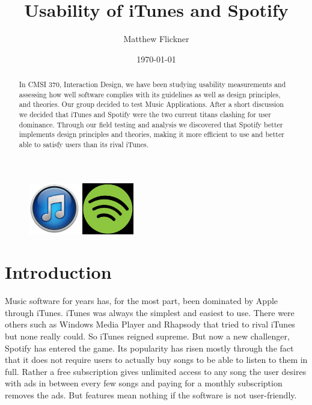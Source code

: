 \documentclass[a4paper]{article}
\title{Usability of iTunes and Spotify}
\author{Matthew Flickner}
\date{\today}
\begin{document}
\maketitle

\begin{abstract}
In CMSI 370, Interaction Design, we have been studying usability measurements and assessing how well software complies with its guidelines as well as design principles, and theories. Our group decided to test Music Applications. After a short discussion we decided that iTunes and Spotify were the two current titans clashing for user dominance. Through our field testing and analysis we discovered that Spotify better implements design principles and theories, making it more efficient to use and better able to satisfy users than its rival iTunes.
\end{abstract}

\begin{figure}[H]
\centering
\includegraphics[width=0.2\textwidth]{ITunes_11_Logo.png}
\includegraphics[width=0.2\textwidth]{spotifylogo.jpg}
\end{figure}

\section{Introduction}

Music software for years has, for the most part, been dominated by Apple through iTunes. iTunes was always the simplest and easiest to use. There were others such as Windows Media Player and Rhapsody that tried to rival iTunes but none really could. So iTunes reigned supreme. But now a new challenger, Spotify has entered the game. Its popularity has risen mostly through the fact that it does not require users to actually buy songs to be able to listen to them in full. Rather a free subscription gives unlimited access to any song the user desires with ads in between every few songs and paying for a monthly subscription removes the ads. But features mean nothing if the software is not user-friendly.
\end{document}

